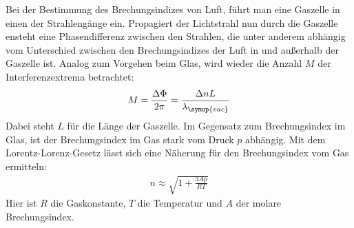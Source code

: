 Bei der Bestimmung des Brechungsindizes von Luft, f\"uhrt man eine Gaszelle in einen der Strahleng\"ange ein. Propagiert der Lichtstrahl nun durch die Gaszelle ensteht eine Phasendifferenz zwischen
den Strahlen, die unter anderem abh\"angig vom Unterschied zwischen
den Brechungsindizes der Luft in und au\ss{}erhalb der Gaszelle ist. Analog zum Vorgehen beim Glas, wird wieder die Anzahl $M$ der Interferenzextrema betrachtet:
\begin{align}
    M = \frac{\Delta\Phi}{2\pi} = \frac{\Delta nL}{\lambda_{\symup{vac}}}
\end{align}
Dabei steht $L$ f\"ur die L\"ange der Gaszelle.
Im Gegensatz zum Brechungsindex im Glas, ist der Brechungsindex im Gas stark vom Druck $p$ abh\"angig. Mit dem Lorentz-Lorenz-Gesetz l\"asst sich eine N\"aherung \cite{lorentz} f\"ur den
Brechungsindex vom Gas ermitteln:
\begin{align}
    n \approx \sqrt{1+\frac{3Ap}{RT}}
\end{align}
Hier ist $R$ die Gaskonstante, $T$ die Temperatur und $A$ der molare Brechungsindex.